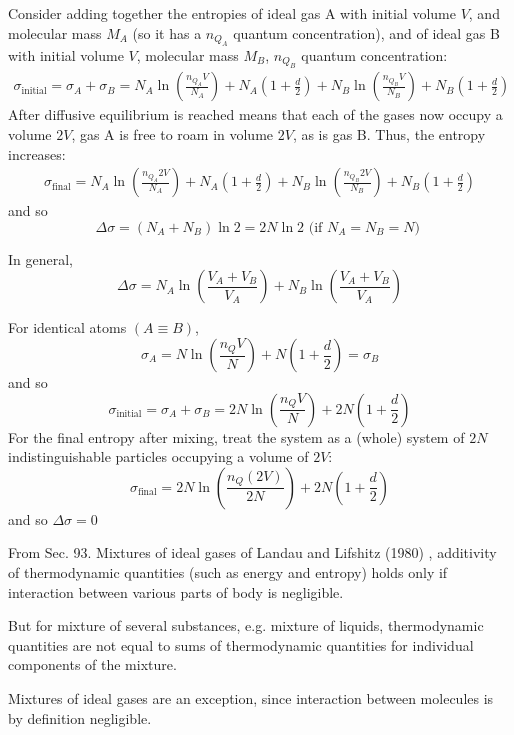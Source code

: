 \documentclass[10pt]{amsart}
\begin{document}
\begin{multicols*}{2}
Consider adding together the entropies of ideal gas A with initial volume $V$, and molecular mass $M_A$ (so it has a $n_{Q_A}$ quantum concentration), and of ideal gas B with initial volume $V$, molecular mass $M_B$, $n_{Q_B}$ quantum concentration:
\[
\begin{gathered}
  \sigma_{\text{initial}} = \sigma_A + \sigma_B = N_A \ln{ \left( \frac{n_{Q_A} V}{N_A} \right) } + N_A \left( 1 + \frac{d}{2} \right)  + N_B \ln{ \left( \frac{n_{Q_B} V}{N_B} \right) } + N_B \left( 1 + \frac{d}{2} \right) 
\end{gathered}
\]
After diffusive equilibrium is reached means that each of the gases now occupy a volume $2V$, gas A is free to roam in volume $2V$, as is gas B.  Thus, the entropy increases:
\[
\begin{gathered}
  \sigma_{\text{final}} = N_A \ln{ \left( \frac{n_{Q_A} 2V}{N_A} \right) } + N_A \left( 1 + \frac{d}{2} \right)  + N_B \ln{ \left( \frac{n_{Q_B} 2V}{N_B} \right) } + N_B \left( 1 + \frac{d}{2} \right) 
\end{gathered}
\]
and so
\[
\Delta \sigma = (N_A + N_B)\ln{2} = 2N\ln{2} \text{ (if $N_A=N_B=N$) }
\]

In general,
\[
\Delta \sigma = N_A \ln{ \left( \frac{V_A + V_B}{V_A} \right) } + N_B \ln{ \left( \frac{V_A + V_B}{V_A} \right) }
\]


For identical atoms $(A\equiv B)$, 
\[
\sigma_A = N \ln{ \left( \frac{ n_Q V}{N} \right) } + N \left( 1 + \frac{d}{2} \right) = \sigma_B
\]
and so
\[
\sigma_{\text{initial}} = \sigma_A + \sigma_B = 2N \ln{ \left( \frac{n_Q V}{N} \right) } + 2N\left( 1 + \frac{d}{2} \right) 
\]
For the final entropy after mixing, treat the system as a (whole) system of $2N$ indistinguishable particles occupying a volume of $2V$:
\[
\sigma_{\text{final}} = 2N \ln{ \left( \frac{n_Q(2V)}{2N} \right) } + 2N \left( 1 + \frac{d}{2} \right)
\]
and so $\Delta \sigma =0$


From Sec. 93. Mixtures of ideal gases of Landau and Lifshitz (1980) \cite{LLandauELifshitz1980}, additivity of thermodynamic quantities (such as energy and entropy) holds only if interaction between various parts of body is negligible. 

But for mixture of several substances, e.g. mixture of liquids, thermodynamic quantities are not equal to sums of thermodynamic quantities for individual components of the mixture. 

Mixtures of ideal gases are an exception, since interaction between molecules is by definition negligible.  


\end{multicols*}
\end{document}
